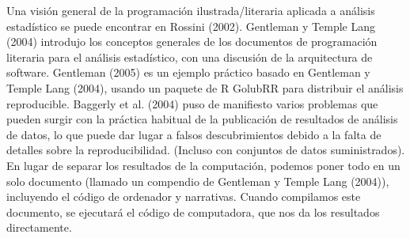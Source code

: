 \documentclass[conference]{IEEEtran}
\begin{document}
Una visión general de la programación ilustrada/literaria aplicada a análisis estadístico se puede encontrar en Rossini (2002). Gentleman y Temple Lang (2004) introdujo los conceptos generales de los documentos de programación literaria para el análisis estadístico, con una discusión de la arquitectura de software. Gentleman (2005) es un ejemplo práctico basado en Gentleman y Temple Lang (2004), usando un paquete de R GolubRR para distribuir el análisis reproducible. Baggerly et al. (2004) puso de manifiesto varios problemas que pueden surgir con la práctica habitual de la publicación de resultados de análisis de datos, lo que puede dar lugar a falsos descubrimientos debido a la falta de detalles sobre la reproducibilidad. (Incluso con conjuntos de datos suministrados). En lugar de separar los resultados de la computación, podemos poner todo en un solo documento (llamado un compendio de Gentleman y Temple Lang (2004)), incluyendo el código de ordenador y narrativas. Cuando compilamos este documento, se ejecutará el código de computadora, que nos da los resultados directamente. 



\end{document}
